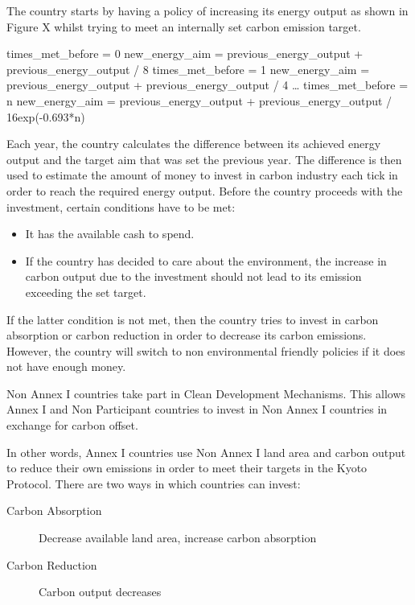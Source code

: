 The country starts by having a policy of increasing its energy output as shown in Figure X whilst trying to meet an internally set carbon emission target.

%
%
\begin{center}
times_met_before = 0 new_energy_aim = previous_energy_output + previous_energy_output / 8
times_met_before = 1 new_energy_aim = previous_energy_output + previous_energy_output / 4 
\dots
times_met_before = n new_energy_aim = previous_energy_output + previous_energy_output / 
16exp(-0.693*n)
\end{center}
%
%

Each year, the country calculates the difference between its achieved energy output and the target aim that was set the previous year. The difference is then used to estimate the amount of money to invest in carbon industry each tick in order to reach the required energy output. Before the country proceeds with the investment, certain conditions have to be met:

\begin{itemize}
\item It has the available cash to spend.
\item If the country has decided to care about the environment, the increase in carbon output due to the investment should not lead to its emission exceeding the set target.
\end{itemize}

If the latter condition is not met, then the country tries to invest in carbon absorption or carbon reduction in order to decrease its carbon emissions. However, the country will switch to non environmental friendly policies if it does not have enough money.
 
Non Annex I countries take part in Clean Development Mechanisms. This allows Annex I and Non Participant countries to invest in Non Annex I countries in exchange for carbon offset.

In other words, Annex I countries use Non Annex I land area and carbon output to reduce their own emissions in order to meet their targets in the Kyoto Protocol. There are two ways in which countries can invest:
 
\begin{description}
\item[Carbon Absorption] Decrease available land area, increase carbon absorption
\item[Carbon Reduction] Carbon output decreases
\end{description}
 
